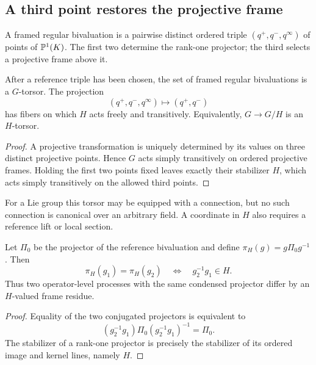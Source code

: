 \subsection{A third point restores the projective frame}

\begin{definition}
A framed regular bivaluation is a pairwise distinct ordered triple
$(q^+,q^-,q^\infty)$ of points of $\mathbb{P}^1(K)$.  The first two determine the
rank-one projector; the third selects a projective frame above it.
\end{definition}

\begin{theorem}
\label{thm:frame-torsor}
After a reference triple has been chosen, the set of framed regular
bivaluations is a $G$-torsor.  The projection
\[
  (q^+,q^-,q^\infty)\longmapsto(q^+,q^-)
\]
has fibers on which $H$ acts freely and transitively.  Equivalently,
$G\to G/H$ is an $H$-torsor.
\end{theorem}

\begin{proof}
A projective transformation is uniquely determined by its values on three
distinct projective points.  Hence $G$ acts simply transitively on ordered
projective frames.  Holding the first two points fixed leaves exactly their
stabilizer $H$, which acts simply transitively on the allowed third points.
\end{proof}

For a Lie group this torsor may be equipped with a connection, but no such
connection is canonical over an arbitrary field.  A coordinate in $H$ also
requires a reference lift or local section.

\begin{proposition}
\label{prop:stabilizer-residue}
Let $\Pi_0$ be the projector of the reference bivaluation and define
$\pi_H(g)=g\Pi_0g^{-1}$.  Then
\[
  \pi_H(g_1)=\pi_H(g_2)
  \quad\Longleftrightarrow\quad
  g_2^{-1}g_1\in H.
\]
Thus two operator-level processes with the same condensed projector differ by
an $H$-valued frame residue.
\end{proposition}

\begin{proof}
Equality of the two conjugated projectors is equivalent to
\[
  (g_2^{-1}g_1)\Pi_0(g_2^{-1}g_1)^{-1}=\Pi_0.
\]
The stabilizer of a rank-one projector is precisely the stabilizer of its
ordered image and kernel lines, namely $H$.
\end{proof}

